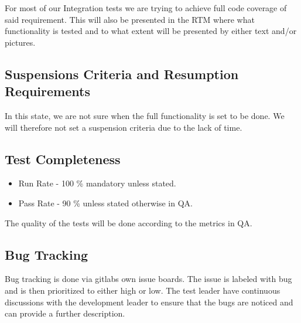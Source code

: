 For most of our Integration tests we are trying to achieve full code coverage of said requirement. This will also be presented in the RTM where what functionality is tested and to what extent will be presented by either text and/or pictures.


\subsection{Suspensions Criteria and Resumption Requirements}
In this state, we are not sure when the full functionality is set to be done. We will therefore not set a suspension criteria due to the lack of time.

\subsection{Test Completeness}
\begin{itemize}
    \item Run Rate - 100 \% mandatory unless stated.
    \item Pass Rate - 90 \% unless stated otherwise in QA.
\end{itemize}
The quality of the tests will be done according to the metrics in QA. 

\subsection{Bug Tracking}
Bug tracking is done via gitlabs own issue boards. The issue is labeled with bug and is then prioritized to either high or low. The test leader have continuous discussions with the development leader to ensure that the bugs are noticed and can provide a further description.

\clearpage